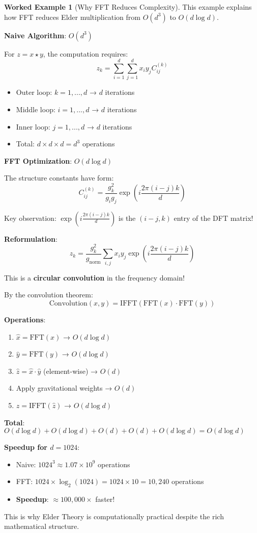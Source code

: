 \documentclass[12pt,a4paper]{article}
\theoremstyle{definition}
\newtheorem{example}{Worked Example}[section]
\theoremstyle{remark}
\begin{document}
\begin{example}[Why FFT Reduces Complexity]
This example explains how FFT reduces Elder multiplication from $O(d^3)$ to $O(d \log d)$.

\textbf{Naive Algorithm}: $O(d^3)$

For $z = x \star y$, the computation requires:
$$z_k = \sum_{i=1}^{d}\sum_{j=1}^{d} x_i y_j C_{ij}^{(k)}$$

\begin{itemize}
\item Outer loop: $k = 1, ..., d$ → $d$ iterations
\item Middle loop: $i = 1, ..., d$ → $d$ iterations  
\item Inner loop: $j = 1, ..., d$ → $d$ iterations
\item Total: $d \times d \times d = d^3$ operations
\end{itemize}

\textbf{FFT Optimization}: $O(d \log d)$

The structure constants have form:
$$C_{ij}^{(k)} = \frac{g_k^2}{g_i g_j} \exp\left(i\frac{2\pi(i-j)k}{d}\right)$$

Key observation: $\exp(i\frac{2\pi(i-j)k}{d})$ is the $(i-j, k)$ entry of the DFT matrix!

\textbf{Reformulation}:
$$z_k = \frac{g_k^2}{g_{\text{norm}}} \sum_{i,j} x_i y_j \exp\left(i\frac{2\pi(i-j)k}{d}\right)$$

This is a \textbf{circular convolution} in the frequency domain!

By the convolution theorem:
$$\text{Convolution}(x, y) = \text{IFFT}(\text{FFT}(x) \cdot \text{FFT}(y))$$

\textbf{Operations}:
\begin{enumerate}
\item $\hat{x} = \text{FFT}(x)$ → $O(d \log d)$
\item $\hat{y} = \text{FFT}(y)$ → $O(d \log d)$
\item $\hat{z} = \hat{x} \cdot \hat{y}$ (element-wise) → $O(d)$
\item Apply gravitational weights → $O(d)$
\item $z = \text{IFFT}(\hat{z})$ → $O(d \log d)$
\end{enumerate}

\textbf{Total}: $O(d \log d) + O(d \log d) + O(d) + O(d) + O(d \log d) = O(d \log d)$

\textbf{Speedup for $d=1024$}:
\begin{itemize}
\item Naive: $1024^3 \approx 1.07 \times 10^9$ operations
\item FFT: $1024 \times \log_2(1024) = 1024 \times 10 = 10,240$ operations
\item \textbf{Speedup}: $\approx 100,000\times$ faster!
\end{itemize}

This is why Elder Theory is computationally practical despite the rich mathematical structure.
\end{example}
\end{document}

